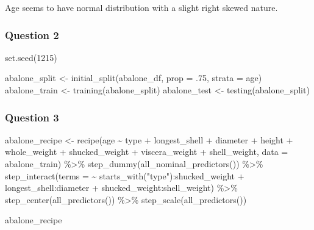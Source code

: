 \documentclass[
]{article}
\newenvironment{Shaded}{\begin{snugshade}}{\end{snugshade}}
\newcommand{\AttributeTok}[1]{\textcolor[rgb]{0.77,0.63,0.00}{#1}}
\newcommand{\DecValTok}[1]{\textcolor[rgb]{0.00,0.00,0.81}{#1}}
\newcommand{\FunctionTok}[1]{\textcolor[rgb]{0.00,0.00,0.00}{#1}}
\newcommand{\NormalTok}[1]{#1}
\newcommand{\OtherTok}[1]{\textcolor[rgb]{0.56,0.35,0.01}{#1}}
\newcommand{\SpecialCharTok}[1]{\textcolor[rgb]{0.00,0.00,0.00}{#1}}
\newcommand{\StringTok}[1]{\textcolor[rgb]{0.31,0.60,0.02}{#1}}
\begin{document}
Age seems to have normal distribution with a slight right skewed nature.

\hypertarget{question-2}{%
\subsubsection{Question 2}\label{question-2}}

\begin{Shaded}
\begin{Highlighting}[]
\FunctionTok{set.seed}\NormalTok{(}\DecValTok{1215}\NormalTok{)}

\NormalTok{abalone\_split }\OtherTok{\textless{}{-}} \FunctionTok{initial\_split}\NormalTok{(abalone\_df, }\AttributeTok{prop =}\NormalTok{ .}\DecValTok{75}\NormalTok{, }\AttributeTok{strata =}\NormalTok{ age)}
\NormalTok{abalone\_train }\OtherTok{\textless{}{-}} \FunctionTok{training}\NormalTok{(abalone\_split)}
\NormalTok{abalone\_test }\OtherTok{\textless{}{-}} \FunctionTok{testing}\NormalTok{(abalone\_split)}
\end{Highlighting}
\end{Shaded}

\hypertarget{question-3}{%
\subsubsection{Question 3}\label{question-3}}

\begin{Shaded}
\begin{Highlighting}[]
\NormalTok{abalone\_recipe }\OtherTok{\textless{}{-}} \FunctionTok{recipe}\NormalTok{(age }\SpecialCharTok{\textasciitilde{}}\NormalTok{ type }\SpecialCharTok{+}\NormalTok{ longest\_shell }\SpecialCharTok{+}\NormalTok{ diameter }\SpecialCharTok{+}\NormalTok{ height }\SpecialCharTok{+}\NormalTok{   whole\_weight }\SpecialCharTok{+}\NormalTok{ shucked\_weight }\SpecialCharTok{+}\NormalTok{ viscera\_weight  }\SpecialCharTok{+}\NormalTok{ shell\_weight, }\AttributeTok{data =}\NormalTok{ abalone\_train) }\SpecialCharTok{\%\textgreater{}\%} 
  \FunctionTok{step\_dummy}\NormalTok{(}\FunctionTok{all\_nominal\_predictors}\NormalTok{()) }\SpecialCharTok{\%\textgreater{}\%} 
  \FunctionTok{step\_interact}\NormalTok{(}\AttributeTok{terms =} \SpecialCharTok{\textasciitilde{}} \FunctionTok{starts\_with}\NormalTok{(}\StringTok{"type"}\NormalTok{)}\SpecialCharTok{:}\NormalTok{shucked\_weight }\SpecialCharTok{+}\NormalTok{ longest\_shell}\SpecialCharTok{:}\NormalTok{diameter }\SpecialCharTok{+}\NormalTok{ shucked\_weight}\SpecialCharTok{:}\NormalTok{shell\_weight) }\SpecialCharTok{\%\textgreater{}\%} 
  \FunctionTok{step\_center}\NormalTok{(}\FunctionTok{all\_predictors}\NormalTok{()) }\SpecialCharTok{\%\textgreater{}\%} 
  \FunctionTok{step\_scale}\NormalTok{(}\FunctionTok{all\_predictors}\NormalTok{())}

\NormalTok{abalone\_recipe}
\end{Highlighting}
\end{Shaded}
\end{document}
